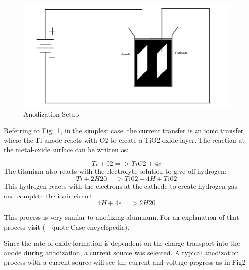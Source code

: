\documentclass[journal]{./IEEEtran}
\begin{document}
\begin{figure}[here]
\centering
\includegraphics{anodSetup}
\caption{Anodization Setup}
\label{fig:anodSetup}
\end{figure}


Referring to Fig:~\ref{fig:anodSetup}, in the simplest case, the current transfer is an ionic transfer where the Ti anode reacts with O2 to create a TiO2 oxide layer. The reaction at the metal-oxide surface can be written as:

\begin{equation}
Ti + 02 => TiO2 + 4e
\end{equation}
The titanium also reacts with the electrolyte solution to give off hydrogen:
\begin{equation}
Ti + 2H20 => Ti02 + 4H+Ti02
\end{equation}
This hydrogen reacts with the electrons at the cathode to create hydrogen gas and complete the ionic circuit.
\begin{equation}
4H + 4e => 2H20
\end{equation}

This process is very similar to anodizing aluminum. For an explanation of that process visit (---quote Case encyclopedia). 

Since the rate of oxide formation is dependent on the charge transport into the anode during anodization, a current source was selected. A typical anodization process with a current source will see the current and voltage progress as in Fig2
 
\end{document}
